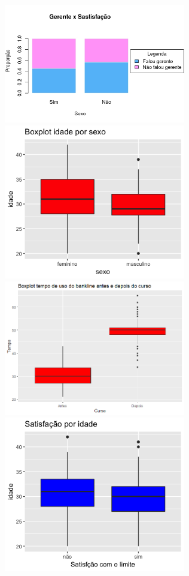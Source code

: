 \documentclass[]{article}
\begin{document}
\includegraphics[width=3.12500in]{Gerente Satisfacao.jpeg}
\includegraphics[width=3.12500in]{boxplot_idade_genero.png}
\includegraphics[width=3.12500in]{Tempo e Curso.png}
\includegraphics[width=3.12500in]{idade_satis.png} \pagebreak 
\end{document}
